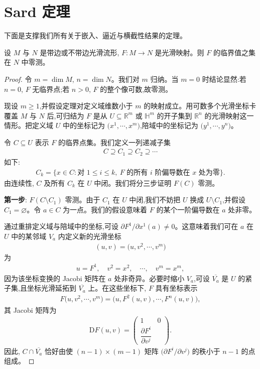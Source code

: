 \documentclass[../../main.tex]{subfiles}
\begin{document}
\section{Sard 定理}\label{section:ch06-Sard定理}

下面是支撑我们所有关于嵌入、逼近与横截性结果的定理。

\begin{theorem}\label{theorem:ch06-sard}
设 $M$ 与 $N$ 是带边或不带边光滑流形, $F:M\to N$ 是光滑映射。则 $F$ 的临界值之集在 $N$ 中零测。
\end{theorem}

\begin{proof}
令 $m=\dim M$, $n=\dim N$。我们对 $m$ 归纳。当 $m=0$ 时结论显然:若 $n=0$, $F$ 无临界点;若 $n>0$, $F$ 的整个像可数,故零测。

现设 $m\geqslant 1$,并假设定理对定义域维数小于 $m$ 的映射成立。用可数多个光滑坐标卡覆盖 $M$ 与 $N$ 后,可归结为 $F$ 是从 $U\subseteq\mathbb{R}^m$ 或 $\mathbb{H}^m$ 的开子集到 $\mathbb{R}^n$ 的光滑映射这一情形。把定义域 $U$ 中的坐标记为 $\bigl(x^1,\cdots ,x^m\bigr)$,陪域中的坐标记为 $\bigl(y^1,\cdots ,y^n\bigr)$。

令 $C\subseteq U$ 表示 $F$ 的临界点集。我们定义一列递减子集
\begin{align*}
C\supseteq C_1\supseteq C_2\supseteq\cdots
\end{align*}
如下:
\begin{align}\label{align:ch06-Ck}
C_k=\{x\in C:\text{对 }1\leqslant i\leqslant k,\ F\text{ 的所有 }i\text{ 阶偏导数在 }x\text{ 处为零}\}.
\end{align}
由连续性, $C$ 及所有 $C_k$ 在 $U$ 中闭。我们将分三步证明 $F(C)$ 零测。

\textbf{第一步}: $F(C\setminus C_1)$ 零测。由于 $C_1$ 在 $U$ 中闭,我们不妨把 $U$ 换成 $U\setminus C_1$,并假设 $C_1=\varnothing$。令 $a\in C$ 为一点。我们的假设意味着 $F$ 的某个一阶偏导数在 $a$ 处非零。

通过重排定义域与陪域中的坐标,可设 $\partial F^1/\partial x^1(a)\neq 0$。这意味着我们可在 $a$ 在 $U$ 中的某邻域 $V_a$ 内定义新的光滑坐标
\begin{align*}
(u,v)=\bigl(u,v^2,\cdots ,v^m\bigr)
\end{align*}
为
\begin{align*}
u=F^1,\quad v^2=x^2,\quad \cdots ,\quad v^m=x^m,
\end{align*}
因为该坐标变换的 Jacobi 矩阵在 $a$ 处非奇异。必要时缩小 $V_a$,可设 $\overline{V_a}$ 是 $U$ 的紧子集,且坐标光滑延拓到 $\overline{V_a}$ 上。在这些坐标下, $F$ 具有坐标表示
\begin{align}\label{align:ch06-F-coords}
F\bigl(u,v^2,\cdots ,v^m\bigr)=\bigl(u,F^2(u,v),\cdots ,F^n(u,v)\bigr),
\end{align}
其 Jacobi 矩阵为
\begin{align*}
\mathrm{D}F(u,v)=
\begin{pmatrix}
1 & 0\\
\dfrac{\partial F^i}{\partial v^j}
\end{pmatrix}.
\end{align*}
因此, $C\cap\overline{V_a}$ 恰好由使 $(n-1)\times(m-1)$ 矩阵 $\bigl(\partial F^i/\partial v^j\bigr)$ 的秩小于 $n-1$ 的点组成。


\end{proof}
\end{document}
